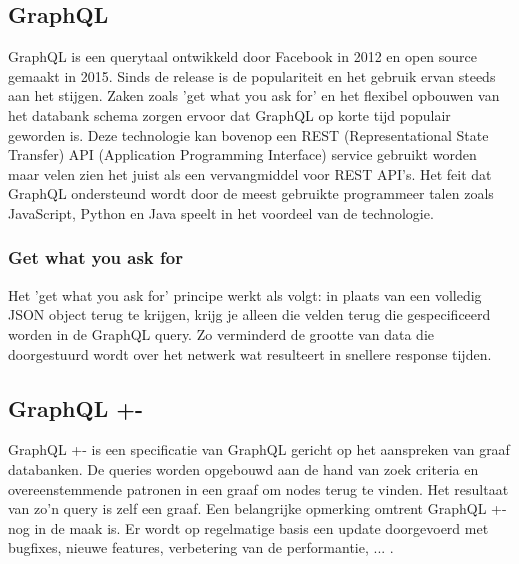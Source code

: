\subsection{GraphQL}
 GraphQL is een querytaal ontwikkeld door Facebook in 2012 en open source gemaakt in 2015. Sinds de release is de populariteit en het gebruik ervan steeds aan het stijgen. Zaken zoals 'get what you ask for' en het flexibel opbouwen van het databank schema zorgen ervoor dat GraphQL op korte tijd populair geworden is. Deze technologie kan bovenop een REST (Representational State Transfer) API (Application Programming Interface) service gebruikt worden maar velen zien het juist als een vervangmiddel voor REST API's. \autocite{dgraphDocs} Het feit dat GraphQL ondersteund wordt door de meest gebruikte programmeer talen zoals JavaScript, Python en Java \autocite{top10Lang} speelt in het voordeel van de technologie.
 
 \subsubsection{Get what you ask for}
 Het 'get what you ask for' principe werkt als volgt: in plaats van een volledig JSON object terug te krijgen, krijg je alleen die velden terug die gespecificeerd worden in de GraphQL query. Zo verminderd de grootte van data die doorgestuurd wordt over het netwerk wat resulteert in snellere response tijden. \autocite{gqlDocs}

\subsection{GraphQL +-}
GraphQL +- is een specificatie van GraphQL gericht op het aanspreken van graaf databanken. De queries worden opgebouwd aan de hand van zoek criteria en overeenstemmende patronen in een graaf om nodes terug te vinden. Het resultaat van zo'n query is zelf een graaf.  Een belangrijke opmerking omtrent GraphQL +- nog in de maak is. Er wordt op regelmatige basis een update doorgevoerd met bugfixes, nieuwe features, verbetering van de performantie, ... . \autocite{dgraphDocs}


